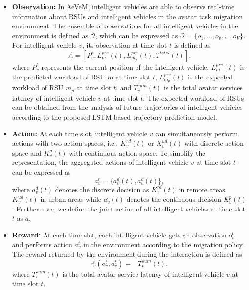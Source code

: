 \documentclass[lettersize,journal]{IEEEtran}
\begin{document}
\begin{itemize}
    \item \textbf{Observation: } In AeVeM, intelligent vehicles are able to observe real-time information about RSUs and intelligent vehicles in the avatar task migration environment. The ensemble of observations for all intelligent vehicles in the environment is defined as $\mathcal{O}$, which can be expressed as $\mathcal{O} = \{ o_1, \dots,o_v, \dots, o_V\}$. For intelligent vehicle $v$, its observation at time slot $t$ is defined as
    \begin{equation}
        o_v^t=[P_v^t,L_m^{pre}(t),L_{m_{p}}^{pre}(t),T^{total}(t)],\label{obs}
    \end{equation}
    where $P_v^t$ represents the current position of the intelligent vehicle, $L_m^{pre}(t)$ is the predicted workload of RSU $m$ at time slot $t$, $L_{m_{p}}^{pre}(t)$ is the expected workload of RSU $m_{p}$ at time slot $t$, and $T^{sum}_v(t)$ is the total avatar services latency of intelligent vehicle $v$ at time slot $t$. The expected workload of RSUs can be obtained from the analysis of future trajectories of intelligent vehicles according to the proposed LSTM-based trajectory prediction model.
    \item \textbf{Action:} At each time slot, intelligent vehicle $v$ can simultaneously perform actions with two action spaces, i.e., $K^{rd}_v(t)$ or $K^{ud}_v(t)$ with discrete action space and $K^p_v(t)$ with continuous action space. To simplify the representation, the aggregated actions of intelligent vehicle $v$ at time slot $t$ can be expressed as 
    \begin{equation}
    a_v^t = \{ a_v^d(t),a_v^c(t)\},\label{action}
    \end{equation}
    where $a_v^d(t)$ denotes the discrete decision as $K^{rd}_v(t)$ in remote areas, $K^{ud}_v(t)$ in urban areas while $a_v^c(t)$ denotes the continuous decision $K^p_v(t)$. Furthermore, we define the joint action of all intelligent vehicles at time slot $t$ as $a$.

    \item \textbf{Reward:} At each time slot, each intelligent vehicle gets an observation $ o_v^t$ and performs action $a_v^t$ in the environment according to the migration policy. The reward returned by the environment during the interaction is defined as
    \begin{equation}
    r_v^t (o_v^t, a_v^t)= -T^{sum}_v(t), \label{eqrew}
    \end{equation}
    where $T^{sum}_v(t)$ is the total avatar service latency of intelligent vehicle $v$ at time slot $t$.
\end{itemize}
\end{document}
